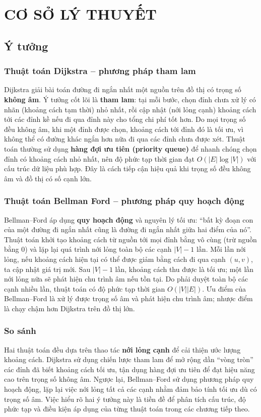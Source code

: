 \documentclass[14pt,a4paper]{report}
\begin{document}




\chapter{CƠ SỞ LÝ THUYẾT}
\section{Ý tưởng}
\subsection{Thuật toán Dijkstra -- phương pháp tham lam}
Dijkstra giải bài toán đường đi ngắn nhất một nguồn trên đồ thị có trọng số \textbf{không âm}. Ý tưởng cốt lõi là \textbf{tham lam}: tại mỗi bước, chọn đỉnh chưa xử lý có nhãn (khoảng cách tạm thời) nhỏ nhất, rồi cập nhật (nới lỏng cạnh) khoảng cách tới các đỉnh kề nếu đi qua đỉnh này cho tổng chi phí tốt hơn. Do mọi trọng số đều không âm, khi một đỉnh được chọn, khoảng cách tới đỉnh đó là tối ưu, vì không thể có đường khác ngắn hơn nữa đi qua các đỉnh chưa được xét. Thuật toán thường sử dụng \textbf{hàng đợi ưu tiên (priority queue) }để nhanh chóng chọn đỉnh có khoảng cách nhỏ nhất, nên độ phức tạp thời gian đạt $O(|E|\log|V|)$ với cấu trúc dữ liệu phù hợp. Đây là cách tiếp cận hiệu quả khi trọng số đều không âm và đồ thị có số cạnh lớn.

\subsection{Thuật toán Bellman Ford -- phương pháp quy hoạch động}
Bellman--Ford áp dụng \textbf{quy hoạch động} và nguyên lý tối ưu: ``bất kỳ đoạn con của một đường đi ngắn nhất cũng là đường đi ngắn nhất giữa hai điểm của nó''. Thuật toán khởi tạo khoảng cách từ nguồn tới mọi đỉnh bằng vô cùng (trừ nguồn bằng 0) và lặp lại quá trình nới lỏng toàn bộ các cạnh $|V|-1$ lần. Mỗi lần nới lỏng, nếu khoảng cách hiện tại có thể được giảm bằng cách đi qua cạnh $(u,v)$, ta cập nhật giá trị mới. Sau $|V|-1$ lần, khoảng cách thu được là tối ưu; một lần nới lỏng nữa sẽ phát hiện chu trình âm nếu tồn tại. Do phải duyệt toàn bộ các cạnh nhiều lần, thuật toán có độ phức tạp thời gian $O(|V||E|)$. Ưu điểm của Bellman--Ford là xử lý được trọng số âm và phát hiện chu trình âm; nhược điểm là chạy chậm hơn Dijkstra trên đồ thị lớn.

\subsection{So sánh}
Hai thuật toán đều dựa trên thao tác \textbf{nới lỏng cạnh} để cải thiện ước lượng khoảng cách. Dijkstra sử dụng chiến lược tham lam để mở rộng dần ``vòng tròn'' các đỉnh đã biết khoảng cách tối ưu, tận dụng hàng đợi ưu tiên để đạt hiệu năng cao trên trọng số không âm. Ngược lại, Bellman--Ford sử dụng phương pháp quy hoạch động, lặp lại việc nới lỏng tất cả các cạnh nhằm đảm bảo tính tối ưu dù có trọng số âm. Việc hiểu rõ hai ý tưởng này là tiền đề để phân tích cấu trúc, độ phức tạp và điều kiện áp dụng của từng thuật toán trong các chương tiếp theo.
\end{document}

